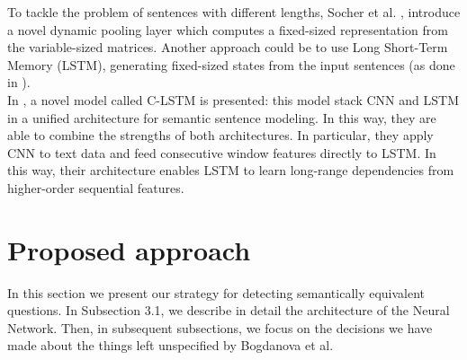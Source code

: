 \documentclass[10pt,twocolumn,letterpaper]{article}
\begin{document}
To tackle the problem of sentences with different lengths, Socher et al. \cite{socher2011dynamic}, introduce a novel dynamic pooling layer which computes a fixed-sized representation from the variable-sized matrices. Another approach could be to use Long Short-Term Memory (LSTM), generating fixed-sized states from the input sentences (as done in \cite{tai2015improved}).\\
In \cite{zhou2015c}, a novel model called C-LSTM is presented: this model stack CNN and LSTM in a unified architecture for semantic sentence modeling. In this way, they are able to combine the strengths of both architectures. In particular, they apply CNN to text data and feed consecutive window features directly to LSTM. In this way, their architecture enables LSTM to learn long-range dependencies from higher-order sequential features.
\section{Proposed approach}
In this section we present our strategy for detecting semantically equivalent questions. In Subsection 3.1, we describe in detail the architecture of the Neural Network. Then, in subsequent subsections, we focus on the decisions we have made about the things left unspecified by Bogdanova et al.
\end{document}
